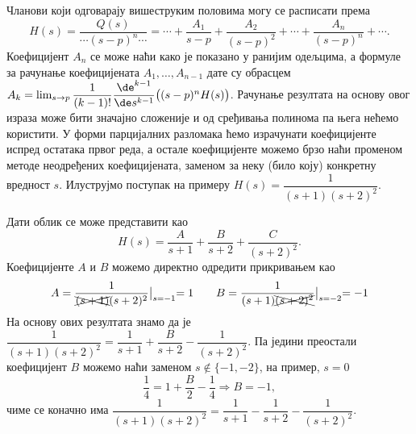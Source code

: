 Чланови који одговарају вишеструким половима могу се расписати према 
\begin{equation}
    H(s) = \dfrac{Q(s)}{\cdots(s - p)^n\cdots} = 
    \cdots
    +
    \dfrac{A_1}{s-p} 
    +
    \dfrac{A_2}{(s-p)^2}
    +
    \cdots
    + 
    \dfrac{A_n}{(s-p)^n}
    +
    \cdots
    .
\end{equation}
Коефицијент $A_n$ се може наћи како је показано у ранијим одељцима, а формуле за рачунање коефицијената 
$A_1, \ldots, A_{n-1}$ дате су обрасцем 
$A_k = \lim_{s \to p} \dfrac{1}{(k-1)!} \dfrac{\de^{k-1}}{\de s^{k-1}} \bigl( (s-p)^n H(s) \bigr)$. 
Рачунање резултата на основу овог израза може бити значајно сложеније и од сређивања полинома па њега нећемо користити. 
У форми парцијалних разломака ћемо израчунати коефицијенте испред остатака првог реда, а остале коефицијенте можемо брзо 
наћи променом методе неодређених коефицијената, заменом за неку (било коју) конкретну вредност $s$. Илуструјмо поступак на примеру
$H(s) = \dfrac{1}{(s+1)(s+2)^2}$.

Дати облик се може представити као 
\begin{equation}
    H(s) = \dfrac{A}{s + 1} + \dfrac{B}{s+2} + \dfrac{C}{(s+2)^2}.
\end{equation}
Коефицијенте $A$ и $B$ можемо директно одредити прикривањем као 
\begin{eqnarray}
    A = \dfrac{1}{ \xcancel{(s+1)}(s+2)^2} \bigl|_{s = -1} = 1 \qquad
    B = \dfrac{1}{ {(s+1)}\xcancel{(s+2)^2}} \bigl|_{s = -2} = -1
\end{eqnarray}
На основу ових резултата знамо да је
$ \dfrac{1}{(s+1)(s+2)^2} = \dfrac{1}{s + 1} + \dfrac{B}{s+2} - \dfrac{1}{(s+2)^2}$. Па једини преостали коефицијент 
$B$ можемо наћи заменом $s \not\in \{-1, -2\}$, на пример, $s = 0$ 
\begin{equation}
    \dfrac{1}{4} = 1 + \dfrac{B}{2} - \dfrac{1}{4} \Rightarrow B = -1, 
\end{equation}
чиме се коначно има 
$ \dfrac{1}{(s+1)(s+2)^2} = \dfrac{1}{s + 1} - \dfrac{1}{s+2} - \dfrac{1}{(s+2)^2}$.